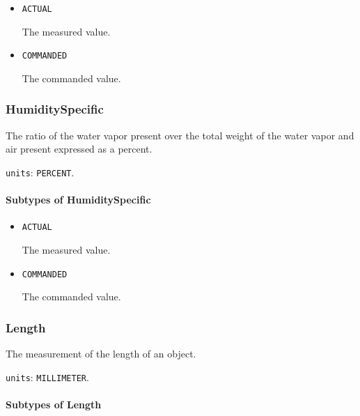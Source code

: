 \begin{itemize}

\item \texttt{ACTUAL}


The measured value.

\item \texttt{COMMANDED}


The commanded value.


\end{itemize}





\subsubsection{HumiditySpecific}
\label{sec:HumiditySpecific}



The ratio of the water vapor present over the total weight of the water vapor and air present expressed as a percent.



\texttt{units}: \texttt{PERCENT}.

\paragraph{Subtypes of HumiditySpecific}\mbox{}
\label{sec:Subtypes of HumiditySpecific}

\begin{itemize}

\item \texttt{ACTUAL}


The measured value.

\item \texttt{COMMANDED}


The commanded value.


\end{itemize}





\subsubsection{Length}
\label{sec:Length}



The measurement of the length of an object.


\texttt{units}: \texttt{MILLIMETER}.

\paragraph{Subtypes of Length}\mbox{}
\label{sec:Subtypes of Length}

